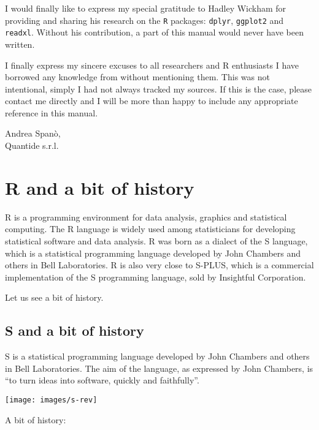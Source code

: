\documentclass[]{book}
\begin{document}
I would finally like to express my special gratitude to Hadley Wickham
for providing and sharing his research on the \texttt{R} packages:
\texttt{dplyr}, \texttt{ggplot2} and \texttt{readxl}. Without his
contribution, a part of this manual would never have been written.

I finally express my sincere excuses to all researchers and R
enthusiasts I have borrowed any knowledge from without mentioning them.
This was not intentional, simply I had not always tracked my sources. If
this is the case, please contact me directly and I will be more than
happy to include any appropriate reference in this manual.

Andrea Spanò,\\
Quantide s.r.l.

\chapter{R and a bit of history}\label{r-and-a-bit-of-history}

R is a programming environment for data analysis, graphics and
statistical computing. The R language is widely used among statisticians
for developing statistical software and data analysis. R was born as a
dialect of the S language, which is a statistical programming language
developed by John Chambers and others in Bell Laboratories. R is also
very close to S-PLUS, which is a commercial implementation of the S
programming language, sold by Insightful Corporation.

Let us see a bit of history.

\section{S and a bit of history}\label{s-and-a-bit-of-history}

S is a statistical programming language developed by John Chambers and
others in Bell Laboratories. The aim of the language, as expressed by
John Chambers, is ``to turn ideas into software, quickly and
faithfully''.

\texttt{[image: images/s-rev]}

A bit of history:
\end{document}
